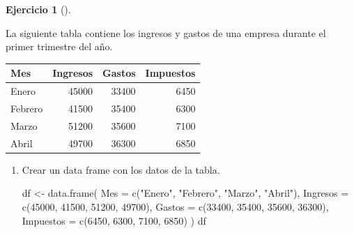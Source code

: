\documentclass[
  a4paper,
]{scrreport}
\newenvironment{Shaded}{\begin{snugshade}}{\end{snugshade}}
\newcommand{\AttributeTok}[1]{\textcolor[rgb]{0.40,0.45,0.13}{#1}}
\newcommand{\DecValTok}[1]{\textcolor[rgb]{0.68,0.00,0.00}{#1}}
\newcommand{\FunctionTok}[1]{\textcolor[rgb]{0.28,0.35,0.67}{#1}}
\newcommand{\NormalTok}[1]{\textcolor[rgb]{0.00,0.23,0.31}{#1}}
\newcommand{\OtherTok}[1]{\textcolor[rgb]{0.00,0.23,0.31}{#1}}
\newcommand{\StringTok}[1]{\textcolor[rgb]{0.13,0.47,0.30}{#1}}
\theoremstyle{definition}
\newtheorem{exercise}{Ejercicio}[chapter]
\theoremstyle{remark}
\begin{document}
\begin{exercise}[]\protect\hypertarget{exr-preprocesamiento-1}{}\label{exr-preprocesamiento-1}

La siguiente tabla contiene los ingresos y gastos de una empresa durante
el primer trimestre del año.

\begin{longtable}[]{@{}lrrr@{}}
\toprule\noalign{}
Mes & Ingresos & Gastos & Impuestos \\
\midrule\noalign{}
\endhead
\bottomrule\noalign{}
\endlastfoot
Enero & 45000 & 33400 & 6450 \\
Febrero & 41500 & 35400 & 6300 \\
Marzo & 51200 & 35600 & 7100 \\
Abril & 49700 & 36300 & 6850 \\
\end{longtable}

\begin{enumerate}
\def\labelenumi{\alph{enumi}.}
\item
  Crear un data frame con los datos de la tabla.

  \begin{tcolorbox}[enhanced jigsaw, colframe=quarto-callout-tip-color-frame, toprule=.15mm, bottomtitle=1mm, breakable, opacitybacktitle=0.6, toptitle=1mm, colback=white, bottomrule=.15mm, title=\textcolor{quarto-callout-tip-color}{\faLightbulb}\hspace{0.5em}{Solución}, arc=.35mm, left=2mm, titlerule=0mm, rightrule=.15mm, coltitle=black, leftrule=.75mm, opacityback=0, colbacktitle=quarto-callout-tip-color!10!white]

\begin{Shaded}
\begin{Highlighting}[]
\NormalTok{df }\OtherTok{\textless{}{-}} \FunctionTok{data.frame}\NormalTok{(}
    \AttributeTok{Mes =} \FunctionTok{c}\NormalTok{(}\StringTok{"Enero"}\NormalTok{, }\StringTok{"Febrero"}\NormalTok{, }\StringTok{"Marzo"}\NormalTok{, }\StringTok{"Abril"}\NormalTok{),}
    \AttributeTok{Ingresos =} \FunctionTok{c}\NormalTok{(}\DecValTok{45000}\NormalTok{, }\DecValTok{41500}\NormalTok{, }\DecValTok{51200}\NormalTok{, }\DecValTok{49700}\NormalTok{),}
    \AttributeTok{Gastos =} \FunctionTok{c}\NormalTok{(}\DecValTok{33400}\NormalTok{, }\DecValTok{35400}\NormalTok{, }\DecValTok{35600}\NormalTok{, }\DecValTok{36300}\NormalTok{),}
    \AttributeTok{Impuestos =} \FunctionTok{c}\NormalTok{(}\DecValTok{6450}\NormalTok{, }\DecValTok{6300}\NormalTok{, }\DecValTok{7100}\NormalTok{, }\DecValTok{6850}\NormalTok{)}
\NormalTok{    )}
\NormalTok{df }
\end{Highlighting}
\end{Shaded}


\end{tcolorbox}
\end{enumerate}
\end{exercise}
\end{document}
